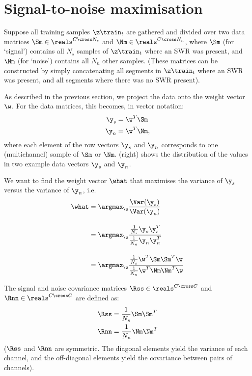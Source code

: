 \section{Signal-to-noise maximisation}
\label{sec:GEVD_SNR}

Suppose all training samples $\z\train_t$ are gathered and divided over two
data matrices $\Sm \in \reals^{C \cross N_s}$ and $\Nm \in \reals^{C \cross
N_n}$, where $\Sm$ (for `signal') contains all $N_s$ samples of $\z\train_t$
where an SWR was present, and $\Nm$ (for `noise') contains all $N_n$ other
samples. (These matrices can be constructed by simply concatenating all
segments in $\z\train_t$ where an SWR was present, and all segments where
there was no SWR present).

As described in the previous section, we project the data onto the weight
vector $\w$. For the data matrices, this becomes, in vector notation:
%
\begin{align*}
\y_s &= \w^T \Sm \\
\y_n &= \w^T \Nm,
\end{align*}
where each element of the row vectors $\y_s$ and $\y_n$ corresponds to one
(multichannel) sample of $\Sm$ or $\Nm$.  (right)
shows the distribution of the values in two example data vectors $\y_s$ and
$\y_n$.

We want to find the weight vector $\what$ that maximises the variance of
$\y_s$ versus the variance of $\y_n$, i.e.
%
\begin{align}
\what &= \argmax_{\w} \frac{\Var(\y_s)}
                           {\Var(\y_n)}  \nonumber \\[1em]
      &= \argmax_{\w} 
         \frac{\frac{1}{N_s} \y_s \y_s^T}
              {\frac{1}{N_n} \y_n \y_n^T}   \label{eq:argmax_SNR} \\[1em]
      &= \argmax_{\w}
         \frac{\frac{1}{N_s} \w^T \Sm \Sm^T \w}
              {\frac{1}{N_n} \w^T \Nm \Nm^T \w}  \nonumber
\end{align}

The signal and noise covariance matrices $\Rss \in \reals^{C \cross C}$ and
$\Rnn \in \reals^{C \cross C}$ are defined as:\footnotemark{}
%
\begin{align}
\Rss &= \frac{1}{N_s} \Sm \Sm^T \label{eq:covariance_s}\\
\Rnn &= \frac{1}{N_n} \Nm \Nm^T \label{eq:covariance_n}
\end{align}
%
($\Rss$ and $\Rnn$ are symmetric. The diagonal elements yield the variance of
each channel, and the off-diagonal elements yield the covariance between
pairs of channels).

